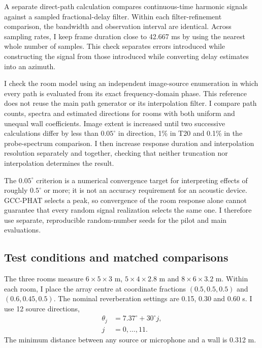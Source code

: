 \documentclass{edpsci}
\begin{document}
A separate direct-path calculation compares continuous-time harmonic signals against a sampled fractional-delay filter. Within each filter-refinement comparison, the bandwidth and observation interval are identical. Across sampling rates, I keep frame duration close to 42.667 ms by using the nearest whole number of samples. This check separates errors introduced while constructing the signal from those introduced while converting delay estimates into an azimuth.

I check the room model using an independent image-source enumeration in which every path is evaluated from its exact frequency-domain phase. This reference does not reuse the main path generator or its interpolation filter. I compare path counts, spectra and estimated directions for rooms with both uniform and unequal wall coefficients. Image extent is increased until two successive calculations differ by less than $0.05^\circ$ in direction, 1\% in T20 and 0.1\% in the probe-spectrum comparison. I then increase response duration and interpolation resolution separately and together, checking that neither truncation nor interpolation determines the result.

The $0.05^\circ$ criterion is a numerical convergence target for interpreting effects of roughly $0.5^\circ$ or more; it is not an accuracy requirement for an acoustic device. GCC-PHAT selects a peak, so convergence of the room response alone cannot guarantee that every random signal realization selects the same one. I therefore use separate, reproducible random-number seeds for the pilot and main evaluations.

\subsection{Test conditions and matched comparisons}

The three rooms measure $6\times5\times3$ m, $5\times4\times2.8$ m and $8\times6\times3.2$ m. Within each room, I place the array centre at coordinate fractions $(0.5,0.5,0.5)$ and $(0.6,0.45,0.5)$. The nominal reverberation settings are 0.15, 0.30 and 0.60 s. I use 12 source directions,
\begin{equation}
	\begin{aligned}
		\theta_j &= 7.37^\circ+30^\circ j,\\
		j &= 0,\ldots,11.
	\end{aligned}
\end{equation}
The minimum distance between any source or microphone and a wall is 0.312 m.
\end{document}
